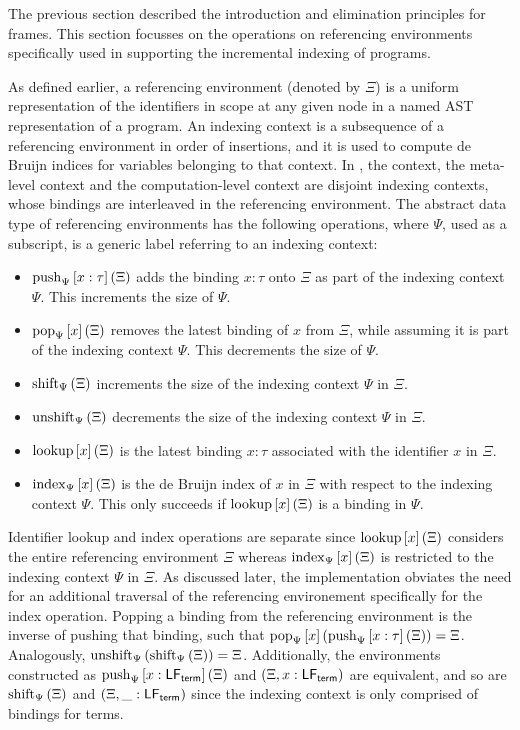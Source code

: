 The previous section described the introduction and elimination principles for frames.
This section focusses on the operations on referencing environments specifically used in supporting the incremental indexing of \Beluga programs.

As defined earlier, a referencing environment (denoted by $\Xi$) is a uniform representation of the identifiers in scope at any given node in a named \ac{AST} representation of a program.
An indexing context is a subsequence of a referencing environment in order of insertions, and it is used to compute de Bruijn indices for variables belonging to that context.
In \Beluga, the \LF context, the meta-level context and the computation-level context are disjoint indexing contexts, whose bindings are interleaved in the referencing environment.
The abstract data type of referencing environments has the following operations, where $\Psi$, used as a subscript, is a generic label referring to an indexing context:
\begin{itemize}
\item
$\operatorname{push}_{\Psi}\left[x : \tau\right]\left(\Xi\right)$ adds the binding $x : \tau$ onto $\Xi$ as part of the indexing context $\Psi$.
This increments the size of $\Psi$.
\item
$\operatorname{pop}_{\Psi}\left[x\right]\left(\Xi\right)$ removes the latest binding of $x$ from $\Xi$, while assuming it is part of the indexing context $\Psi$.
This decrements the size of $\Psi$.
\item
$\operatorname{shift}_{\Psi}\left(\Xi\right)$ increments the size of the indexing context $\Psi$ in $\Xi$.
\item
$\operatorname{unshift}_{\Psi}\left(\Xi\right)$ decrements the size of the indexing context $\Psi$ in $\Xi$.
\item
$\operatorname{lookup}\left[x\right]\left(\Xi\right)$ is the latest binding $x : \tau$ associated with the identifier $x$ in $\Xi$.
\item
$\operatorname{index}_{\Psi}\left[x\right]\left(\Xi\right)$ is the de Bruijn index of $x$ in $\Xi$ with respect to the indexing context $\Psi$.
This only succeeds if $\operatorname{lookup}\left[x\right]\left(\Xi\right)$ is a binding in $\Psi$.
\end{itemize}

Identifier lookup and index operations are separate since $\operatorname{lookup}\left[x\right]\left(\Xi\right)$ considers the entire referencing environment $\Xi$ whereas $\operatorname{index}_{\Psi}\left[x\right]\left(\Xi\right)$ is restricted to the indexing context $\Psi$ in $\Xi$.
As discussed later, the implementation obviates the need for an additional traversal of the referencing environement specifically for the index operation.
Popping a binding from the referencing environment is the inverse of pushing that binding, such that $\operatorname{pop}_{\Psi}\left[x\right]\left(\operatorname{push}_{\Psi}\left[x : \tau\right]\left(\Xi\right)\right) = \Xi$.
Analogously, $\operatorname{unshift}_{\Psi}\left(\operatorname{shift}_{\Psi}\left(\Xi\right)\right) = \Xi$.
Additionally, the environments constructed as $\operatorname{push}_{\Psi}\left[x : \mathsf{LF}_{\mathsf{term}}\right]\left(\Xi\right) $ and $ (\Xi, x : \mathsf{LF}_{\mathsf{term}})$ are equivalent, and so are $\operatorname{shift}_{\Psi}\left(\Xi\right) $ and $ (\Xi, \_ : \mathsf{LF}_{\mathsf{term}})$ since the \LF indexing context is only comprised of bindings for \LF terms.

